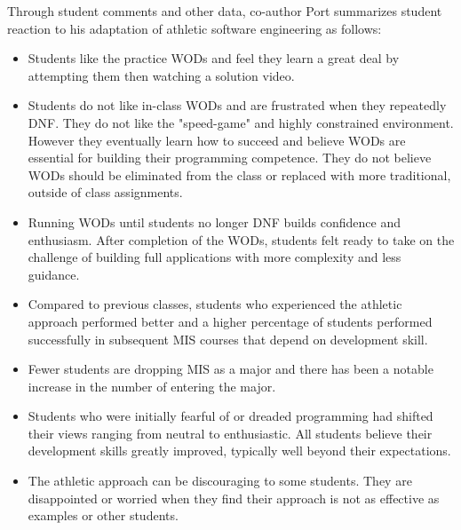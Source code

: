 Through student comments and other data, co-author Port summarizes student reaction to his adaptation of athletic software engineering as follows:
\begin{itemize} 
\item Students like the practice WODs and feel they learn a great deal by attempting them then watching a solution video.
\item Students do not like in-class WODs and are frustrated when they repeatedly DNF. They do not like the "speed-game" and highly constrained environment. However they eventually learn how to succeed and believe WODs are essential for building their programming competence. They do not believe WODs should be eliminated from the class or replaced with more traditional, outside of class assignments.
\item Running WODs until students no longer DNF builds confidence and enthusiasm. After completion of the WODs, students felt ready to take on the challenge of building full applications with more complexity and less guidance. 
\item Compared to previous classes, students who experienced the athletic approach performed better and a higher percentage of students performed successfully in subsequent MIS courses that depend on development skill.  
\item Fewer students are dropping MIS as a major and there has been a notable increase in the number of entering the major. 
\item Students who were initially fearful of or dreaded programming had shifted their views ranging from neutral to enthusiastic. All students believe their development skills greatly improved, typically well beyond their expectations.
\item The athletic approach can be discouraging to some students. They are disappointed or worried when they find their approach is not as effective as examples or other students.    
\end{itemize} 